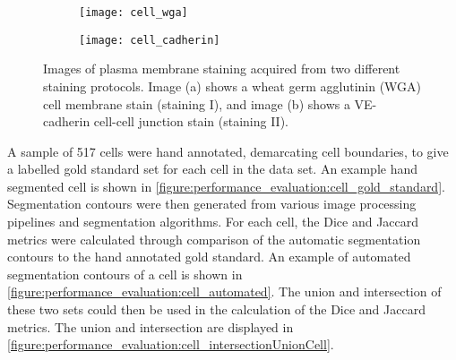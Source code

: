 \begin{figure}[htbp]\centering
	\begin{subfigure}[b]{0.49\linewidth}
		\centering
		\texttt{[image: cell\_wga]}
		\caption{}
		\label{figure:performance_evaluation:staining_1}
		\vspace{1ex}
	\end{subfigure}
	\begin{subfigure}[b]{0.49\linewidth}
		\centering
		\texttt{[image: cell\_cadherin]}
		\caption{}
		\label{figure:performance_evaluation:staining_2}
		\vspace{1ex}
	\end{subfigure}
\caption[Cell staining protocols]{Images of plasma membrane staining acquired from two different staining protocols. Image (a) shows a wheat germ agglutinin (WGA) cell membrane stain (staining I), and image (b) shows a VE-cadherin cell-cell junction stain (staining II).}
\label{figure:performance_evaluation:staining}
\end{figure}

A sample of 517 cells were hand annotated, demarcating cell boundaries, to give a labelled gold standard set for each cell in the data set. An example hand segmented cell is shown in \autoref{figure:performance_evaluation:cell_gold_standard}. Segmentation contours were then generated from various image processing pipelines and segmentation algorithms. For each cell, the Dice and Jaccard metrics were calculated through comparison of the automatic segmentation contours to the hand annotated gold standard. An example of automated segmentation contours of a cell is shown in \autoref{figure:performance_evaluation:cell_automated}. The union and intersection of these two sets could then be used in the calculation of the Dice and Jaccard metrics. The union and intersection are displayed in \autoref{figure:performance_evaluation:cell_intersectionUnionCell}.

